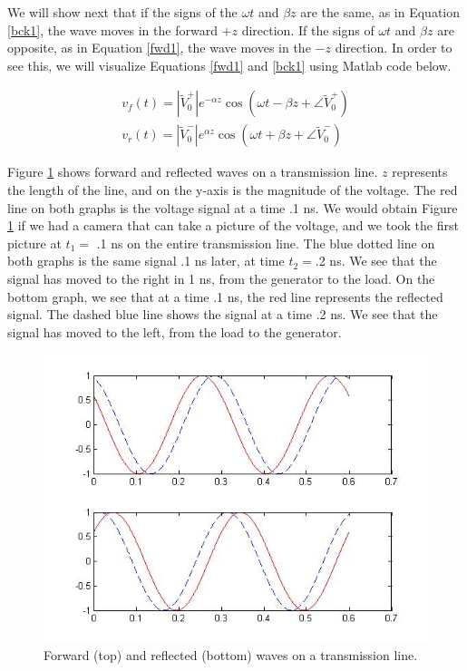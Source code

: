 \documentclass{ximera}
\begin{document}
\begin{example}

We will show next that if  the signs of the $\omega t$ and
$\beta z$ are the same, as in Equation \ref{bck1}, the wave moves in the forward $+z$
direction. If the signs of $\omega t$ and $\beta z$ are opposite, as in Equation \ref{fwd1}, the
wave moves in the $-z$ direction. In order to see this, we will visualize Equations \ref{fwd1} and \ref{bck1} using Matlab code below.

\begin{eqnarray}
v_f(t)=|\tilde{V}_0^+| e^{ - \alpha z} \cos(\omega t - \beta z + \angle \tilde{V}_0^+) \label{fwd1} \\
v_r(t)= |\tilde{V}_0^-|e^{\alpha z} \cos(\omega t + \beta z + \angle \tilde{V}_0^-) \label{bck1}
\end{eqnarray}


Figure \ref{fwrdref}  shows forward and reflected waves on a transmission line.  $z$ represents the length of the line,  and on the y-axis is the magnitude of the voltage.   The red line on both graphs is the voltage signal at a time  .1 ns. We would obtain  Figure \ref{fwrdref} if we had a camera that can take a picture of the voltage, and we took the first picture at $t_1=$ .1 ns on the entire transmission line.  The blue dotted line on both graphs is the same signal .1 ns later,  at time $t_2=$.2  ns.  We see that the signal has moved to the right in  1 ns,  from the generator to the load.  On the bottom graph, we see that at a time .1 ns, the red line represents the reflected signal.  The dashed blue line shows the signal at a time .2 ns. We see that the signal has moved to the left, from the load to the generator. 


\begin{figure}[ht!]
\begin{center}
\includegraphics[scale=0.5]{../jpg/frwrdwave_01.jpg}
\caption{\label{fwrdref} Forward (top) and reflected (bottom) waves on a transmission line.}
\end{center}
\end{figure}



\end{example}
\end{document}
